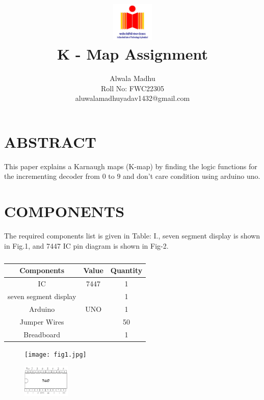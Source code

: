 \documentclass[conference]{IEEEtran}
\title{
\vspace{1cm}
{\includegraphics[width=0.15\textwidth]{b.jpg} \\ K - Map Assignment} }
\author{Alwala Madhu \\ Roll No: FWC22305 \\ aluwalamadhuyadav1432@gmail.com}
\begin{document}
 \maketitle
 \section {ABSTRACT}
 This paper explains a Karnaugh maps (K-map) by finding the logic functions for the incrementing decoder from $0$ to $9$ and don't care condition using arduino uno.

\section{COMPONENTS}
The required components list is given in Table: I., seven segment display is shown in Fig.1, and 7447 IC pin diagram is shown in Fig-2.
\vspace{0.3cm}
 \begin{table} [htbp]
\centering
\begin{tabular}{| c | c | c |} \hline
Components & Value & Quantity \\\hline
IC & 7447 & 1 \\ \hline
seven segment display & & 1\\ \hline
Arduino & UNO & 1 \\ \hline
Jumper Wires &  & 50 \\ \hline
Breadboard & & 1 \\ 
\hline
\end{tabular}
\vspace{0.3cm}
\caption{\label{tab:widgets}}
\end{table}

\begin{figure}[h]                           
\centering                                 
\texttt{[image: fig1.jpg]}                                           
\caption{\label{fig-1:Gates}}               
\end{figure}

\begin{figure}[h]                           
\centering                                 
\includegraphics[width=0.2\textwidth]{fig2.jpg }                                           
\caption{\label{fig-2:Gates}}               
\end{figure}
\end{document}
